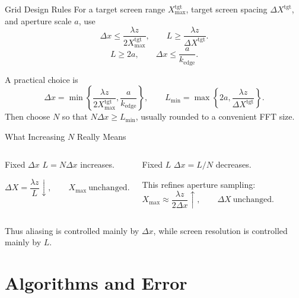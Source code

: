 \documentclass[aspectratio=169,11pt]{beamer}
\begin{document}
\begin{frame}{Grid Design Rules}
    For a target screen range \(X_{\max}^{\mathrm{tgt}}\), target screen spacing
    \(\Delta X^{\mathrm{tgt}}\), and aperture scale \(a\), use
    \[
        \Delta x\leq \frac{\lambda z}{2X_{\max}^{\mathrm{tgt}}},
        \qquad
        L\geq \frac{\lambda z}{\Delta X^{\mathrm{tgt}}}.
    \]
    \[
        L\geq 2a,\qquad
        \Delta x\leq \frac{a}{k_{\mathrm{edge}}}.
    \]

    \vspace{0.15cm}
    A practical choice is
    \[
        \Delta x=\min\!\left\{\frac{\lambda z}{2X_{\max}^{\mathrm{tgt}}},
        \frac{a}{k_{\mathrm{edge}}}\right\},\qquad
        L_{\min}=\max\!\left\{2a,\frac{\lambda z}{\Delta X^{\mathrm{tgt}}}\right\}.
    \]
    Then choose \(N\) so that \(N\Delta x\geq L_{\min}\), usually rounded to a convenient FFT size.
\end{frame}

\begin{frame}{What Increasing \(N\) Really Means}
    \begin{columns}[T,onlytextwidth]
        \begin{block}{Fixed \(\Delta x\)}
            \(L=N\Delta x\) increases.

            \[
                \Delta X=\frac{\lambda z}{L}\downarrow,\qquad
                X_{\max}\ \text{unchanged}.
            \]
        \end{block}

        \begin{block}{Fixed \(L\)}
            \(\Delta x=L/N\) decreases.

            \vspace{0.1cm}
            This refines aperture sampling:
            \[
                X_{\max}\approx\frac{\lambda z}{2\Delta x}\uparrow,\qquad
                \Delta X\ \text{unchanged}.
            \]
        \end{block}
    \end{columns}

    \vspace{0.15cm}
    Thus aliasing is controlled mainly by \(\Delta x\), while screen resolution is controlled mainly by
    \(L\).
\end{frame}

\section{Algorithms and Error}
\end{document}
